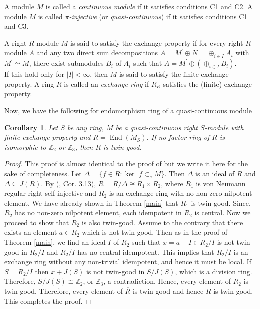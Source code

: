 \documentclass{amsart}
\newtheorem{corollary}[theorem]{Corollary}
\begin{document}
\bigskip

\noindent A module $M$ is called a {\it continuous module} if it satisfies conditions C1 and C2. A module $M$ is called {\it $\pi$-injective} (or {\it quasi-continuous}) if it satisfies conditions C1 and C3. 

\bigskip

\noindent A right $R$-module $M$ is said to satisfy the exchange property if for every right $R$-module $A$ and any two direct sum decompositions $A=M^{\prime}\oplus N=\oplus_{i\in I}A_{i}$ with $M^{\prime} \simeq M$, there exist submodules $B_i$ of $A_i$ such that $A=M^{\prime} \oplus (\oplus_{i \in I}B_i)$.\\
If this hold only for $|I|<\infty$, then $M$ is said to satisfy the finite exchange property. A ring $R$ is called an {\it exchange ring} if $R_R$ satisfies the (finite) exchange property.  

\noindent Now, we have the following for endomorphism ring of a quasi-continuous module
 
\begin{corollary}
Let $S$ be any ring, $M$ be a quasi-continuous right $S$-module with finite exchange property and $R=\operatorname{End}(M_S)$. If no factor ring of $R$ is isomorphic to $\mathbb{Z}_{2}$ or $\mathbb Z_3$, then $R$ is twin-good.
\end{corollary}

\begin{proof}
This proof is almost identical to the proof of \cite[Theorem 3]{KS1} but we write it here for the sake of completeness. Let $\Delta =\{f\in R:\ker $ $f\subset _{e}M\}$. Then $\Delta $ is an ideal of $R$ and $\Delta \subseteq J(R)$. By (\cite{mm}, Cor. 3.13), $\overline{R}=R/\Delta \cong R_{1}\times
R_{2}$, where $R_{1}$ is von Neumann regular right self-injective and $R_{2}$ is an
exchange ring with no non-zero nilpotent element. We have already shown in
Theorem \ref{main} that $R_{1}$ is twin-good. Since, $R_{2}$
has no non-zero nilpotent element, each idempotent in $R_{2}$ is central. Now we proceed to show that $R_2$ is also twin-good. Assume to the contrary that there exists an element $a\in R_{2}$ which is not twin-good. Then as in the
proof of Theorem \ref{main}, we find an ideal $I$ of $R_{2}$ such that $x=a+I\in
R_{2}/I$ is not twin-good in $R_{2}/I$ and $R_{2}/I$ has no central
idempotent. This implies that $R_{2}/I$ is an exchange ring without any
non-trivial idempotent, and hence it must be local. If $S=R_{2}/I$ then $x+J(S)$ is not twin-good in $S/J(S)$, which is a division ring.
Therefore, $S/J(S)\cong \mathbb{Z}_{2}$, or $\mathbb Z_3$, a contradiction. Hence, every
element of $R_{2}$ is twin-good. Therefore, every element of $\overline{R}$ is twin-good and hence $R$
is twin-good. This completes the proof.
\end{proof}
\end{document}
